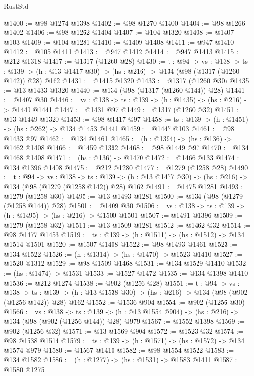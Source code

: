 \begin{lexlean}{RustStd}
\begin{coremodule}
{\begin{coremodule}
{{{{{{{{@1400 := @98 @1274 @1398
@1402 := @98 @1270 @1400
@1404 := @98 @1266 @1402
@1406 := @98 @1262 @1404
@1407 := @104 @1320
@1408 := @1407 @103
@1409 := @104 @1281
@1410 := @1409 @1408
@1411 := @947 @1410
@1412 := @105 @1411
@1413 := @947 @1412
@1414 := @947 @1413
@1415 := @212 @1318
@1417 := @1317 (@1260 @28)
@1430 := {t : @94} ->
  {vs : @138} ->
  {ts : @139} -> (h : @13 @1417 @30) -> (hs : @216) -> @134 (@98 (@1317 (@1260 @142)) @28) @162
@1431 := @1415 @1320
@1433 := @1317 (@1260 @30)
@1435 := @13 @1433 @1320
@1440 := @134 (@98 (@1317 (@1260 @144)) @28)
@1441 := @1407 @30
@1446 := {vs : @138} -> {ts : @139} -> (h : @1435) -> (hs : @216) -> @1440 @1441
@1447 := @1431 @97
@1449 := @1317 (@1260 @32)
@1451 := @13 @1449 @1320
@1453 := @98 @1417 @97
@1458 := {ts : @139} -> (h : @1451) -> (hs : @262) -> @134 @1453 @1441
@1459 := @1447 @103
@1461 := @98 @1433 @97
@1462 := @134 @1461
@1465 := (h : @1394) -> (hs : @136) -> @1462 @1408
@1466 := @1459 @1392
@1468 := @98 @1449 @97
@1470 := @134 @1468 @1408
@1471 := (hs : @136) -> @1470
@1472 := @1466 @133
@1474 := @134 @1396 @1408
@1475 := @212 @1280
@1477 := @1279 (@1258 @28)
@1490 := {t : @94} ->
  {vs : @138} ->
  {ts : @139} -> (h : @13 @1477 @30) -> (hs : @216) -> @134 (@98 (@1279 (@1258 @142)) @28) @162
@1491 := @1475 @1281
@1493 := @1279 (@1258 @30)
@1495 := @13 @1493 @1281
@1500 := @134 (@98 (@1279 (@1258 @144)) @28)
@1501 := @1409 @30
@1506 := {vs : @138} -> {ts : @139} -> (h : @1495) -> (hs : @216) -> @1500 @1501
@1507 := @1491 @1396
@1509 := @1279 (@1258 @32)
@1511 := @13 @1509 @1281
@1512 := @1462 @32
@1514 := @98 @1477 @1453
@1519 := {ts : @139} -> (h : @1511) -> (hs : @1512) -> @134 @1514 @1501
@1520 := @1507 @1408
@1522 := @98 @1493 @1461
@1523 := @134 @1522
@1526 := (h : @1314) -> (hs : @1470) -> @1523 @1410
@1527 := @1520 @1312
@1529 := @98 @1509 @1468
@1531 := @134 @1529 @1410
@1532 := (hs : @1474) -> @1531
@1533 := @1527 @1472
@1535 := @134 @1398 @1410
@1536 := @212 @1274
@1538 := @902 (@1256 @28)
@1551 := {t : @94} ->
  {vs : @138} ->
  {ts : @139} -> (h : @13 @1538 @30) -> (hs : @216) -> @134 (@98 (@902 (@1256 @142)) @28) @162
@1552 := @1536 @904
@1554 := @902 (@1256 @30)
@1566 := {vs : @138} ->
  {ts : @139} -> (h : @13 @1554 @904) -> (hs : @216) -> @134 (@98 (@902 (@1256 @144)) @28) @979
@1567 := @1552 @1398
@1569 := @902 (@1256 @32)
@1571 := @13 @1569 @904
@1572 := @1523 @32
@1574 := @98 @1538 @1514
@1579 := {ts : @139} -> (h : @1571) -> (hs : @1572) -> @134 @1574 @979
@1580 := @1567 @1410
@1582 := @98 @1554 @1522
@1583 := @134 @1582
@1586 := (h : @1277) -> (hs : @1531) -> @1583 @1411
@1587 := @1580 @1275
}}}}}}}}
\end{coremodule}}
\end{coremodule}
\end{lexlean}
